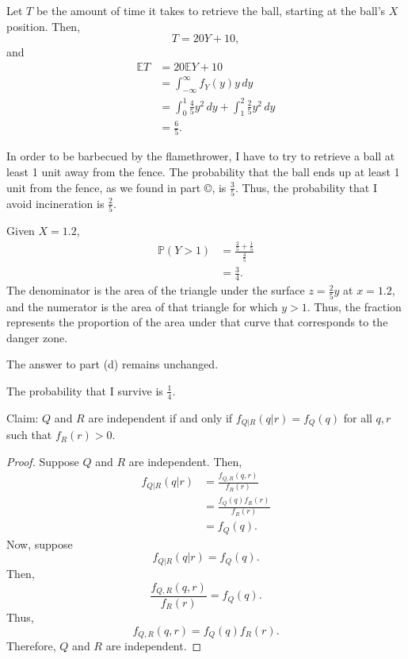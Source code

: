 \documentclass[12pt]{article}
\begin{document}
\medskip
{}

    Let $T$ be the amount of time it takes to retrieve the ball, starting at the ball's $X$ position. Then, $$T = 20Y + 10,$$ and
    \begin{align*}
        \mathbb ET &= 20\mathbb EY + 10 \\
                   &= \int_{-\infty}^\infty f_Y(y)y\,dy \\
                   &= \int_0^1 \frac45y^2 \,dy + \int_1^2 \frac25y^2 \,dy \\
                   &= \frac65.
    \end{align*}

\medskip
{}

    In order to be barbecued by the flamethrower, I have to try to retrieve a ball at least 1 unit away from the fence. The probability that the ball ends up at least 1 unit from the fence, as we found in part \copyright, is $\frac35$. Thus, the probability that I avoid incineration is $\frac25$.

\medskip
{} Given $X=1.2$,
\begin{align*}
    \mathbb P(Y > 1) &= \frac{\frac25 + \frac15}{\frac45} \\
                     &= \frac34.
\end{align*} The denominator is the area of the triangle under the surface $z=\frac25y$ at $x=1.2$, and the numerator is the area of that triangle for which $y > 1$. Thus, the fraction represents the proportion of the area under that curve that corresponds to the danger zone.

The answer to part (d) remains unchanged.

The probability that I survive is $\frac14$.

\newpage
{}

\medskip
{} Claim: $Q$ and $R$ are independent if and only if $f_{Q|R}(q|r) = f_Q(q)$ for all $q,r$ such that $f_R(r) > 0$.
\begin{proof}
    Suppose $Q$ and $R$ are independent. Then,
    \begin{align*}
        f_{Q|R}(q|r) &= \frac{f_{Q,R}(q,r)}{f_R(r)} \\
                     &= \frac{f_Q(q)f_R(r)}{f_R(r)} \\
                     &= f_Q(q).
    \end{align*}
    Now, suppose $$f_{Q|R}(q|r) = f_Q(q).$$ Then, $$\frac{f_{Q,R}(q,r)}{f_R(r)} = f_Q(q).$$ Thus, $$f_{Q,R}(q,r) = f_Q(q)f_R(r).$$ Therefore, $Q$ and $R$ are independent.
\end{proof}
\end{document}
